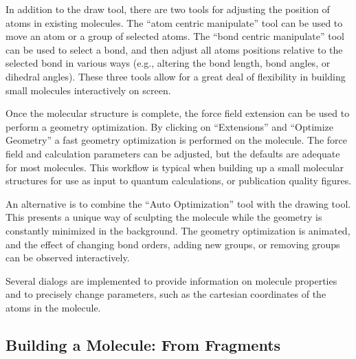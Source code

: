 \documentclass[10pt]{bmc_article}
\newenvironment{bmcformat}{\begin{raggedright}
\baselineskip20pt\sloppy\setboolean{publ}{false}}{\end{raggedright}
\baselineskip20pt\sloppy}
\begin{document}
\begin{bmcformat}
In addition to the draw tool, there are two tools for adjusting the position of
atoms in existing molecules. The ``atom centric manipulate'' tool can be used to
move an atom or a group of selected atoms. The ``bond centric manipulate'' tool
can
be used to select a bond, and then adjust all atoms positions relative to the
selected bond in various ways (e.g., altering the bond length, bond
angles, or dihedral angles). These three tools allow for a great deal of
flexibility in building small molecules interactively on screen.

Once the molecular structure is complete, the force field extension can be used to
perform a geometry optimization. By clicking on ``Extensions'' and ``Optimize
Geometry'' a fast geometry optimization is performed on the molecule. The
force field and calculation parameters can be adjusted, but the defaults are
adequate for most molecules. This workflow is typical when building up a small
molecular structures for use as input to quantum calculations, or publication
quality figures.

An alternative is to combine the ``Auto Optimization'' tool with the drawing
tool. This presents a unique way of sculpting the molecule while the geometry is
constantly minimized in the background. The geometry optimization is animated,
and the effect of changing bond orders, adding new groups, or removing groups can
be observed interactively.

Several dialogs are implemented to provide information on molecule properties
and to precisely change parameters, such as the cartesian coordinates of the atoms
in the molecule.

\subsection{Building a Molecule: From Fragments}


\end{bmcformat}
\end{document}
